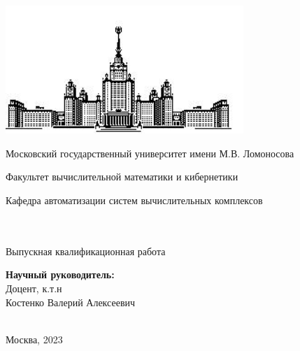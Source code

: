 \makeatletter
\begin{titlepage}
    \begin{center}
        \includegraphics[width=9cm]{imgs/msulogo.png}\\
        \small
        \centerline{Московский государственный университет имени М.В. Ломоносова}
        \centerline{Факультет вычислительной математики и кибернетики}
        \centerline{Кафедра автоматизации систем вычислительных комплексов}
        \centerline{}
        \Large
        \vfill
        {\@author}\\
        \null
        {\LARGE \bf
        \@title
        }\\
        \null \null
        {\large Выпускная квалификационная работа}\\
        \null \null
    \end{center}
    \begin{flushright}
        {\bf Научный руководитель:}\\
        Доцент, к.т.н \\Костенко Валерий Алексеевич\\
        ~\\
        \vfill
    \end{flushright}
    \centerline{Москва, 2023}
\end{titlepage}
\setcounter{page}{2}
